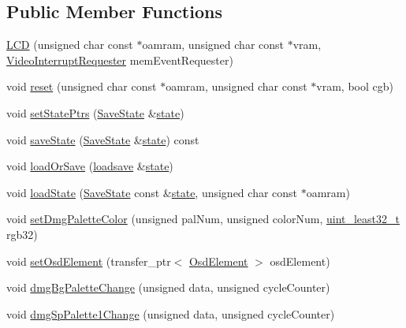 \subsection*{Public Member Functions}
\begin{DoxyCompactItemize}
\item 
\hyperlink{classgambatte_1_1LCD_a27e5f50cbdc1381331be589e35d06650}{L\+CD} (unsigned char const $\ast$oamram, unsigned char const $\ast$vram, \hyperlink{classgambatte_1_1VideoInterruptRequester}{Video\+Interrupt\+Requester} mem\+Event\+Requester)
\item 
void \hyperlink{classgambatte_1_1LCD_a91d74117a2d391d7fab9edc40083531b}{reset} (unsigned char const $\ast$oamram, unsigned char const $\ast$vram, bool cgb)
\item 
void \hyperlink{classgambatte_1_1LCD_ad5525500b675e02a9245ec727b13529c}{set\+State\+Ptrs} (\hyperlink{structgambatte_1_1SaveState}{Save\+State} \&\hyperlink{ppu_8cpp_a2f2eca6997ee7baf8901725ae074d45b}{state})
\item 
void \hyperlink{classgambatte_1_1LCD_a26c4d435be473121e49887c692df9929}{save\+State} (\hyperlink{structgambatte_1_1SaveState}{Save\+State} \&\hyperlink{ppu_8cpp_a2f2eca6997ee7baf8901725ae074d45b}{state}) const
\item 
void \hyperlink{classgambatte_1_1LCD_a516d73f82da6e3908ac8a9fc6899effc}{load\+Or\+Save} (\hyperlink{classgambatte_1_1loadsave}{loadsave} \&\hyperlink{ppu_8cpp_a2f2eca6997ee7baf8901725ae074d45b}{state})
\item 
void \hyperlink{classgambatte_1_1LCD_a9cd3dc21fda725807416ef6b48535f07}{load\+State} (\hyperlink{structgambatte_1_1SaveState}{Save\+State} const \&\hyperlink{ppu_8cpp_a2f2eca6997ee7baf8901725ae074d45b}{state}, unsigned char const $\ast$oamram)
\item 
void \hyperlink{classgambatte_1_1LCD_a824214d860aa4220cb3d058916336261}{set\+Dmg\+Palette\+Color} (unsigned pal\+Num, unsigned color\+Num, \hyperlink{namespacegambatte_a0639f09fccfbbd5a8e0796318768e370}{uint\+\_\+least32\+\_\+t} rgb32)
\item 
void \hyperlink{classgambatte_1_1LCD_a14411e312354ba1d703ae7f6746c431f}{set\+Osd\+Element} (transfer\+\_\+ptr$<$ \hyperlink{classgambatte_1_1OsdElement}{Osd\+Element} $>$ osd\+Element)
\item 
void \hyperlink{classgambatte_1_1LCD_a318d43c9f52b40ee4201fc2838c3661e}{dmg\+Bg\+Palette\+Change} (unsigned data, unsigned cycle\+Counter)
\item 
void \hyperlink{classgambatte_1_1LCD_a3f6a486f4432e89a8a30ac819c0fa437}{dmg\+Sp\+Palette1\+Change} (unsigned data, unsigned cycle\+Counter)

\end{DoxyCompactItemize}
